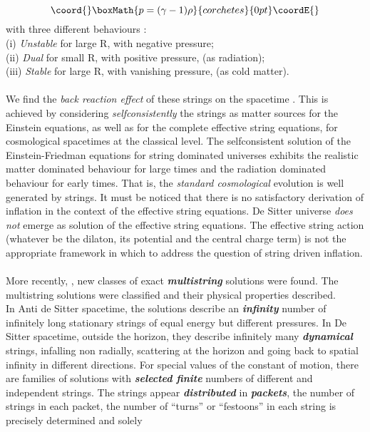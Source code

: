 \documentclass[12pt,a4paper]{article}
\begin{document}
\begin{displaymath}\coord{}\boxMath{
 p=(\gamma-1)\rho 
}{corchetes}{0pt}\coordE{}\end{displaymath} 
with three different behaviours :\\ (i) {\it Unstable} for 
large R, with negative pressure;\\ (ii) {\it Dual} for small R, with positive
pressure, (as radiation);\\ (iii) {\it Stable} for large R, with vanishing 
pressure, (as cold matter). \\ \\
We find the {\it back reaction effect} of these strings on the spacetime \cite{vs3}. 
This is achieved by considering {\it selfconsistently} the strings as matter 
sources for the Einstein equations, as well as for the complete effective 
string equations, for cosmological spacetimes at the classical level. The
selfconsistent solution of the Einstein-Friedman equations for string 
dominated universes exhibits the realistic matter dominated behaviour for 
large times and the radiation dominated behaviour for early times. That is, 
the {\it standard cosmological} evolution is well generated by strings. It 
must be noticed that there is no satisfactory derivation of inflation in the
context of the effective string equations. De Sitter universe {\it does not} 
emerge 
as solution of the effective string equations. The effective string action 
(whatever be the dilaton, its potential and the central charge term) is not 
the appropriate framework in which to address the question of string driven 
inflation. \\ \\
More recently, \cite{ls1}, new classes of exact {\it \bf multistring} solutions were found. The multistring solutions were classified and their physical 
properties described.\\ In Anti de Sitter spacetime, the solutions describe an 
{\it \bf infinity} number of infinitely long stationary strings of equal energy but different pressures. In De Sitter spacetime, outside the horizon, 
they describe infinitely many {\it \bf dynamical} strings, infalling non radially, scattering at the horizon and going back to spatial infinity in 
different directions. For special values of the constant of motion, there are 
families of solutions with {\it \bf selected finite} numbers of different and independent strings. The strings appear {\it \bf distributed} in 
{\it \bf packets}, the number of strings in each packet, the number of 
``turns'' or ``festoons'' in each string is precisely determined and solely 
\end{document}

